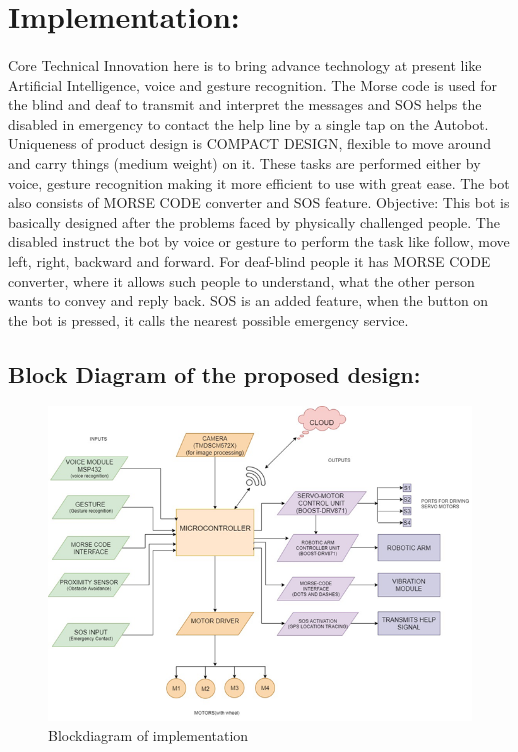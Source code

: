 \documentclass[12pt,a4paper]{article}
\begin{document}
	\section{Implementation:}
	\paragraph{}
	Core Technical Innovation here is to bring advance technology at present like Artificial Intelligence, voice and gesture recognition. The Morse code is used for the blind and deaf to transmit and interpret the messages and SOS helps the disabled in emergency to contact the help line by a single tap on the Autobot. Uniqueness of product design is COMPACT DESIGN, flexible to move around and carry things (medium weight) on it. These tasks are performed either by voice, gesture recognition making it more efficient to use with great ease. The bot also consists of MORSE CODE converter and SOS feature. Objective: This bot is basically designed after the problems faced by physically challenged people. The disabled instruct the bot by voice or gesture to perform the task like follow, move left, right, backward and forward. For deaf-blind people it has MORSE CODE converter, where it allows such people to understand, what the other person wants to convey and reply back. SOS is an added feature, when the button on the bot is pressed, it calls the nearest possible emergency service.
	\newpage

	\newpage
	\subsection{Block Diagram of the proposed design:}

	
	\begin{figure}
		\includegraphics[width=\linewidth]{Blockdiagram.png}
		\caption{Blockdiagram of implementation}
		\label{Figure::blockdiagram}
	\end{figure}
\end{document}
